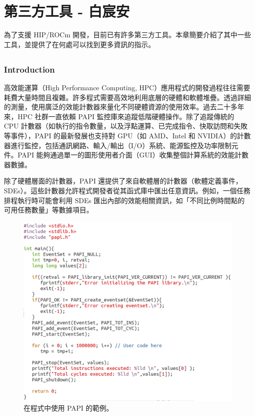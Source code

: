 \chapter{第三方工具 - 白宸安}
\label{chap:Third-Party Tools}

為了支援 HIP/ROCm 開發，目前已有許多第三方工具。本章簡要介紹了其中一些工具，並提供了在何處可以找到更多資訊的指示。

\section{}
\subsection{Introduction}

高效能運算（High Performance Computing, HPC）應用程式的開發過程往往需要耗費大量時間且複雜。許多程式需要高效地利用底層的硬體和軟體堆疊。透過詳細的測量，使用廣泛的效能計數器來量化不同硬體資源的使用效率。過去二十多年來，HPC 社群一直依賴 PAPI 監控庫來追蹤低階硬體操作。除了追蹤傳統的 CPU 計數器（如執行的指令數量，以及浮點運算、已完成指令、快取訪問和失敗等事件），PAPI 的最新發展也支持對 GPU（如 AMD、Intel 和 NVIDIA）的計數器進行監控，包括通訊網路、輸入/輸出（I/O）系統、能源監控及功率限制元件。PAPI 能夠通過單一的圖形使用者介面（GUI）收集整個計算系統的效能計數器數據。

除了硬體層面的計數器，PAPI 還提供了來自軟體層的計數器（軟體定義事件，SDEs）。這些計數器允許程式開發者從其函式庫中匯出任意資訊。例如，一個任務排程執行時可能會利用 SDEs 匯出內部的效能相關資訊，如「不同比例時間點的可用任務數量」等數據項目。


\begin{figure}
    \centering
    \includegraphics[width=0.9\linewidth]{FileAusiliari/Screenshots/Figure13-1.png}
    \caption{在程式中使用 PAPI 的範例。}
    \label{fig:PAPI}
\end{figure}

